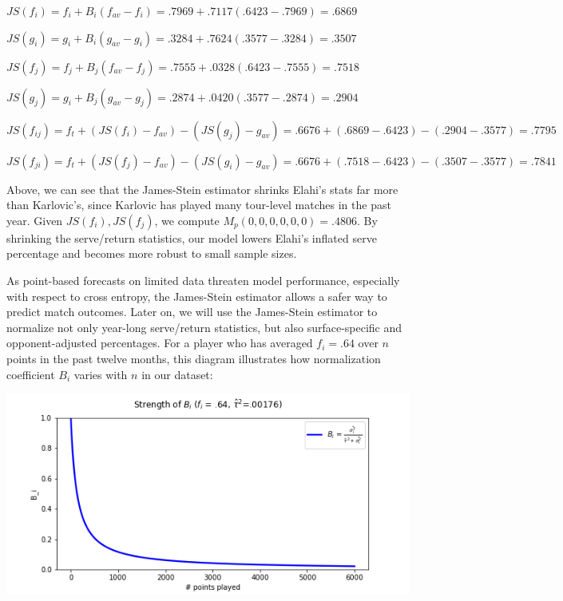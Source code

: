 \documentclass[chapterprefix=false]{report}
\begin{document}
\begin{center}
$JS(f_i) = f_i + B_i(f_{av}-f_i) = .7969 + .7117(.6423-.7969) = .6869$

$JS(g_i) = g_i + B_i(g_{av}-g_i) = .3284 + .7624(.3577-.3284) = .3507$

$JS(f_j) = f_j + B_j(f_{av}-f_j) = .7555 + .0328(.6423-.7555) = .7518$

$JS(g_j) = g_i + B_j(g_{av}-g_j) = .2874 + .0420(.3577-.2874) = .2904$

$JS(f_{ij}) = f_t + (JS(f_i)-f_{av})-(JS(g_j)-g_{av}) = .6676 + (.6869-.6423) - (.2904-.3577) = .7795$

$JS(f_{ji}) = f_t + (JS(f_j)-f_{av})-(JS(g_i)-g_{av}) = .6676 + (.7518-.6423) - (.3507-.3577) = .7841$

\end{center}

Above, we can see that the James-Stein estimator shrinks Elahi's stats far more than Karlovic's, since Karlovic has played many tour-level matches in the past year. Given $JS(f_i),JS(f_j)$, we compute $M_p(0,0,0,0,0,0) = .4806$. By shrinking the serve/return statistics, our model lowers Elahi's inflated serve percentage and becomes more robust to small sample sizes.

As point-based forecasts on limited data threaten model performance, especially with respect to cross entropy, the James-Stein estimator allows a safer way to predict match outcomes. Later on, we will use the James-Stein estimator to normalize not only year-long serve/return statistics, but also surface-specific and opponent-adjusted percentages. For a player who has averaged $f_i=.64$ over $n$ points in the past twelve months, this diagram illustrates how normalization coefficient $B_i$ varies with $n$ in our dataset:

\includegraphics[scale=.7]{norm_fig}


\end{document}
